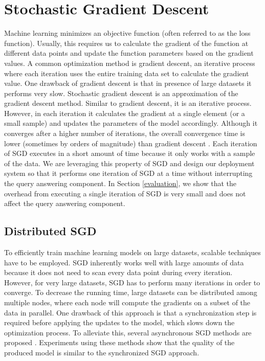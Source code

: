 \documentclass{vldb}
\begin{document}
\section{Stochastic Gradient Descent} \label{sgd}
Machine learning minimizes an objective function (often referred to as the loss function).
Usually, this requires us to calculate the gradient of the function at different data points and update the function parameters based on the gradient values.
A common optimization method is gradient descent, an iterative process where each iteration uses the entire training data set to calculate the gradient value.
One drawback of gradient descent is that in presence of large datasets it performs very slow.
Stochastic gradient descent \cite{bottou2010large} is an approximation of the gradient descent method. 
Similar to gradient descent, it is an iterative process.
However, in each iteration it calculates the gradient at a single element (or a small sample) and updates the parameters of the model accordingly. 
Although it converges after a higher number of iterations, the overall convergence time is lower (sometimes by orders of magnitude) than gradient descent \cite{bottou2010large}. 
Each iteration of SGD executes in a short amount of time because it only works with a sample of the data.
We are leveraging this property of SGD and design our deployment system so that it performs one iteration of SGD at a time without interrupting the query answering component.
In Section \ref{evaluation}, we show that the overhead from executing a single iteration of SGD is very small and does not affect the query answering component.

\subsection{Distributed SGD}
To efficiently train machine learning models on large datasets, scalable techniques have to be employed.
SGD inherently works well with large amounts of data because it does not need to scan every data point during every iteration.
However, for very large datasets, SGD has to perform many iterations in order to converge.
To decrease the running time, large datasets can be distributed among multiple nodes, where each node will compute the gradients on a subset of the data in parallel.
One drawback of this approach is that a synchronization step is required before applying the updates to the model, which slows down the optimization process.
To alleviate this, several asynchronous SGD methods are proposed \cite{recht2011hogwild, dean2012large}. 
Experiments using these methods show that the quality of the produced model is similar to the synchronized SGD approach.
\end{document}
